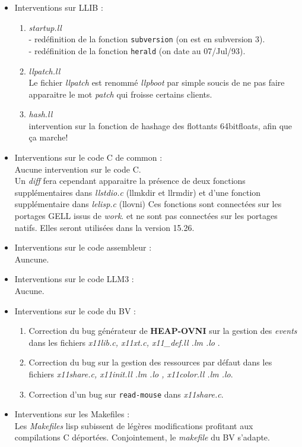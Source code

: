 \begin {itemize}
\item Interventions sur LLIB :\\
\begin {enumerate}
\item {\it startup.ll} \\
- red\'{e}finition de la fonction {\tt subversion} (on est en subversion 3).\\
- red\'{e}finition de la fonction {\tt herald}     (on date au 07/Jul/93).

\item {\it llpatch.ll} \\
Le fichier {\it llpatch} est renomm\'{e} {\it llpboot} par simple soucis de
ne pas faire apparaitre le mot {\it patch} qui froisse certains clients.

\item {\it hash.ll} \\
intervention sur la fonction de hashage des flottants 64bitfloats,
afin que \c{c}a marche!
\end{enumerate}

\item Interventions sur le code C de common :\\
Aucune intervention sur le code C.\\
Un {\it diff} fera cependant apparaitre la pr\'{e}sence de deux fonctions
suppl\'{e}mentaires dans {\it llstdio.c} (llmkdir et llrmdir)
et d'une fonction suppl\'{e}mentaire dans {\it lelisp.c} (llovni)
Ces fonctions sont connect\'{e}es sur les portages GELL issus de {\it work}.
et ne sont pas connect\'{e}es sur les portages natifs.
Elles seront utilis\'{e}es dans la version 15.26.

\item Interventions sur le code assembleur :\\
Auncune.

\item Interventions sur le code LLM3 :\\
Aucune.

\item Interventions sur le code du BV :\\
\begin{enumerate}
\item
Correction du bug g\'{e}n\'{e}rateur de {\bf HEAP-OVNI} sur la gestion
des {\it events} dans les fichiers {\it x11lib.c, x11xt.c,
x11\_def.ll .lm .lo} .
\item
Correction du bug sur la gestion des ressources par d\'{e}faut dans les
fichiers {\it x11share.c, x11init.ll .lm .lo , x11color.ll .lm .lo}.
\item
Correction d'un bug sur {\tt read-mouse} dans {\it x11share.c}.
\end{enumerate}

\item Interventions sur les Makefiles :\\
Les {\it Makefiles} lisp subissent de l\'{e}g\`{e}res modifications
profitant aux compilations C d\'{e}port\'{e}es.
Conjointement, le {\it makefile} du BV s'adapte.
\end {itemize}

